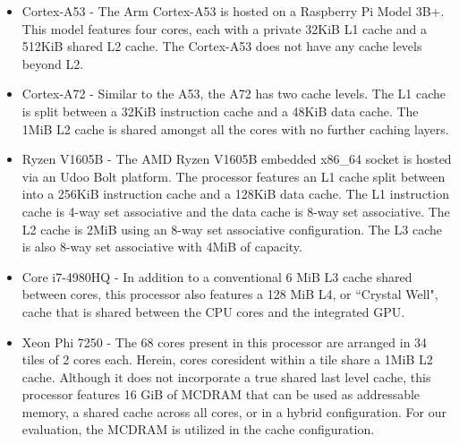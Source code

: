 \begin{itemize}
\item Cortex-A53 - The Arm Cortex-A53 is hosted on a Raspberry Pi Model 3B+.  This model features four cores, each with a private 32KiB L1 cache and a 512KiB shared L2 cache.  The Cortex-A53 does not have any cache levels beyond L2.  
\newline
\item Cortex-A72 - Similar to the A53, the A72 has two cache levels.  The L1 cache is split between a 32KiB instruction cache and a 48KiB data cache.  The 1MiB L2 cache is shared amongst all the cores with no further caching layers.  
\newline
\item Ryzen V1605B - The AMD Ryzen V1605B embedded x86\_64 socket is hosted via an Udoo Bolt platform.  The processor features an L1 cache split between into a 256KiB instruction cache and a 128KiB data cache.  The L1 instruction cache is 4-way set associative and the data cache is 8-way set associative.  The L2 cache is 2MiB using an 8-way set associative configuration.  The L3 cache is also 8-way set associative with 4MiB of capacity.  
\newline
\item Core i7-4980HQ - In addition to a conventional 6 MiB L3 cache shared between cores, this processor also features a 128 MiB L4, or ``Crystal Well", cache that is shared between the CPU cores and the integrated GPU.
\newline
\item Xeon Phi 7250 - The 68 cores present in this processor are arranged in 34 tiles of 2 cores each.
Herein, cores coresident within a tile share a 1MiB L2 cache.
Although it does not incorporate a true shared last level cache, this processor features 16 GiB of MCDRAM that can be used as addressable memory, a shared cache across all cores, or in a hybrid configuration. 
For our evaluation, the MCDRAM is utilized in the cache configuration.
\end{itemize}


